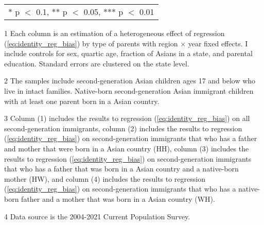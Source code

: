 \begin{table}[H]
{\begin{threeparttable}
\begin{tabular}[t]{lcccc}
\bottomrule
\multicolumn{5}{l}{\rule{0pt}{1em}* p $<$ 0.1, ** p $<$ 0.05, *** p $<$ 0.01}\\
\end{tabular}
\begin{tablenotes}
\small
\item[1] \footnotesize{Each column is an estimation of a heterogeneous effect of regression (\ref{eq:identity_reg_bias}) by 
                      type of parents with region × year fixed effects. 
                      I include controls for sex, quartic age, fraction of Asians in a state, and parental education.
                      Standard errors are clustered on the state level.}
\item[2] \footnotesize{The samples include second-generation Asian children ages 17 and below who live in intact families. 
                      Native-born second-generation Asian 
                      immigrant children with at least one parent born in a Asian 
                      country.}
\item[3] \footnotesize{Column (1) includes the results to regression (\ref{eq:identity_reg_bias}) on all second-generation immigrants, 
                                        column (2) includes the results to regression (\ref{eq:identity_reg_bias}) on second-generation immigrants that who has a father and mother that were born in a Asian country (HH),
                                        column (3) includes the results to regression (\ref{eq:identity_reg_bias}) on second-generation immigrants that who has a father that was born in a Asian country and a native-born mother (HW), and
                                        column (4) includes the results to regression (\ref{eq:identity_reg_bias}) on second-generation immigrants that who has a native-born father and a mother that was born in a Asian country (WH).}
\item[4] \footnotesize{Data source is the 2004-2021 Current Population Survey.}
\end{tablenotes}
\end{threeparttable}}
\end{table}
